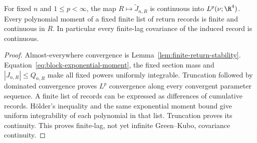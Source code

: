 \begin{corollary}
\label{cor:all-moment-continuity}
For fixed $n$ and $1\le p<\infty$, the map
$R\mapsto\widetilde J_{n,R}$ is continuous into $L^p(\nu;\R^4)$.
Every polynomial moment of a fixed finite list of return records is
finite and continuous in $R$. In particular every finite-lag covariance
of the induced record is continuous.
\end{corollary}
\begin{proof}
Almost-everywhere convergence is Lemma~\ref{lem:finite-return-stability}.
Equation~\eqref{eq:block-exponential-moment}, the fixed section mass and
$|J_{n,R}|\le Q_{n,R}$ make all fixed powers uniformly integrable.
Truncation followed by dominated convergence proves $L^p$ convergence
along every convergent parameter sequence. A finite list of records can
be expressed as differences of cumulative records. H\"older's inequality
and the same exponential moment bound give uniform integrability of each
polynomial in that list. Truncation proves its continuity. This proves
finite-lag, not yet infinite Green--Kubo, covariance continuity.
\end{proof}
